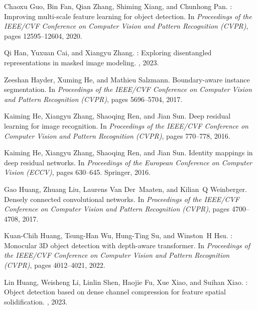 \documentclass[10pt,twocolumn,letterpaper]{article}
\begin{document}
{\begin{thebibliography}{10}
		Chaoxu Guo, Bin Fan, Qian Zhang, Shiming Xiang, and Chunhong Pan.
		: Improving multi-scale feature learning for object
		detection.
		\newblock In {\em Proceedings of the IEEE/CVF Conference on Computer Vision and
			Pattern Recognition (CVPR)}, pages 12595--12604, 2020.
		
		Qi Han, Yuxuan Cai, and Xiangyu Zhang.
		: Exploring disentangled representations in masked image
		modeling.
		,
		2023.
		
		Zeeshan Hayder, Xuming He, and Mathieu Salzmann.
		\newblock Boundary-aware instance segmentation.
		\newblock In {\em Proceedings of the IEEE/CVF Conference on Computer Vision and
			Pattern Recognition (CVPR)}, pages 5696--5704, 2017.
		
		Kaiming He, Xiangyu Zhang, Shaoqing Ren, and Jian Sun.
		\newblock Deep residual learning for image recognition.
		\newblock In {\em Proceedings of the IEEE/CVF Conference on Computer Vision and
			Pattern Recognition (CVPR)}, pages 770--778, 2016.
		
		Kaiming He, Xiangyu Zhang, Shaoqing Ren, and Jian Sun.
		\newblock Identity mappings in deep residual networks.
		\newblock In {\em Proceedings of the European Conference on Computer Vision
			(ECCV)}, pages 630--645. Springer, 2016.
		
		Gao Huang, Zhuang Liu, Laurens Van Der~Maaten, and Kilian~Q Weinberger.
		\newblock Densely connected convolutional networks.
		\newblock In {\em Proceedings of the IEEE/CVF Conference on Computer Vision and
			Pattern Recognition (CVPR)}, pages 4700--4708, 2017.
		
		Kuan-Chih Huang, Tsung-Han Wu, Hung-Ting Su, and Winston~H Hsu.
		: Monocular {3D} object detection with depth-aware
		transformer.
		\newblock In {\em Proceedings of the IEEE/CVF Conference on Computer Vision and
			Pattern Recognition (CVPR)}, pages 4012--4021, 2022.
		
		Lin Huang, Weisheng Li, Linlin Shen, Haojie Fu, Xue Xiao, and Suihan Xiao.
		: Object detection based on dense channel compression for
		feature spatial solidification.
		, 2023.
		

\end{thebibliography}}
\end{document}
